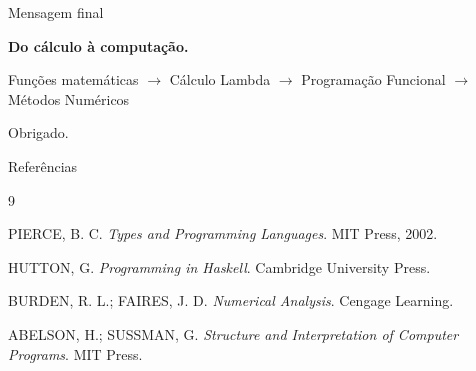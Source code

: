 \documentclass[aspectratio=169,11pt]{beamer}
\begin{document}
\begin{frame}{Mensagem final}
    \begin{center}
        \Huge\textbf{Do cálculo à computação.}
        \vspace{0.6cm}

        \Large
        Funções matemáticas
        $\rightarrow$
        Cálculo Lambda
        $\rightarrow$
        Programação Funcional
        $\rightarrow$
        Métodos Numéricos
    \end{center}
    \vfill
    \begin{center}\normalsize Obrigado.\end{center}
\end{frame}

\begin{frame}[allowframebreaks]{Referências}
    \footnotesize
    \begin{thebibliography}{9}

        PIERCE, B. C.
        \newblock \emph{Types and Programming Languages}.
        \newblock MIT Press, 2002.

        HUTTON, G.
        \newblock \emph{Programming in Haskell}.
        \newblock Cambridge University Press.

        BURDEN, R. L.; FAIRES, J. D.
        \newblock \emph{Numerical Analysis}.
        \newblock Cengage Learning.

        ABELSON, H.; SUSSMAN, G.
        \newblock \emph{Structure and Interpretation of Computer Programs}.
        \newblock MIT Press.

    \end{thebibliography}
\end{frame}
\end{document}
